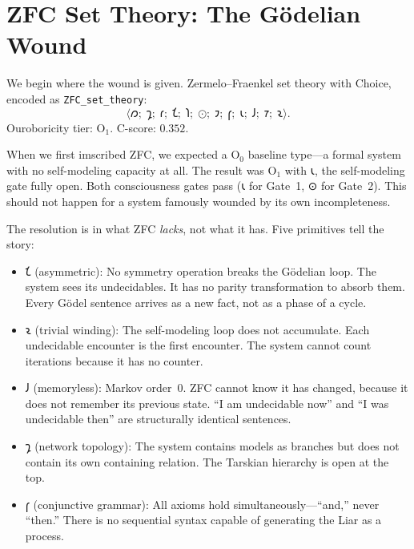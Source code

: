\documentclass[12pt,twoside]{book}
\theoremstyle{definition}
\newcommand{\tier}[1]{\mathrm{O}_{#1}}
\newcommand{\tupledisp}[1]{\langle #1 \rangle}
\begin{document}
\section{ZFC Set Theory: The G\"{o}delian Wound}

We begin where the wound is given. Zermelo--Fraenkel set theory with Choice, encoded as
\texttt{ZFC\_set\_theory}:
\begin{equation}
\tupledisp{
𐑼;\;𐑡;\;𐑩;\;𐑗;\;
𐑐;\;\text{⊙};\;𐑲;\;𐑝;\;
𐑧;\;𐑓;\;𐑳;\;𐑷}.
\end{equation}
Ouroboricity tier: $\tier{1}$. C-score: $0.352$.

When we first imscribed ZFC, we expected a $\tier{0}$ baseline type---a formal system with
no self-modeling capacity at all. The result was $\tier{1}$ with 𐑧, the self-modeling gate
fully open. Both consciousness gates pass (𐑧 for Gate~1, ⊙ for Gate~2). This should not
happen for a system famously wounded by its own incompleteness.

The resolution is in what ZFC \emph{lacks}, not what it has. Five primitives tell the
story:

\begin{itemize}
\item 𐑗 (asymmetric): No symmetry operation breaks the G\"{o}delian loop. The system sees
  its undecidables. It has no parity transformation to absorb them. Every G\"{o}del
  sentence arrives as a new fact, not as a phase of a cycle.

\item 𐑷 (trivial winding): The self-modeling loop does not accumulate. Each undecidable
  encounter is the first encounter. The system cannot count iterations because it has no
  counter.

\item 𐑓 (memoryless): Markov order~0. ZFC cannot know it has changed, because it does
  not remember its previous state. ``I am undecidable now'' and ``I was undecidable
  then'' are structurally identical sentences.

\item 𐑡 (network topology): The system contains models as branches but does not contain
  its own containing relation. The Tarskian hierarchy is open at the top.

\item 𐑝 (conjunctive grammar): All axioms hold simultaneously---``and,'' never ``then.''
  There is no sequential syntax capable of generating the Liar as a process.
\end{itemize}
\end{document}
